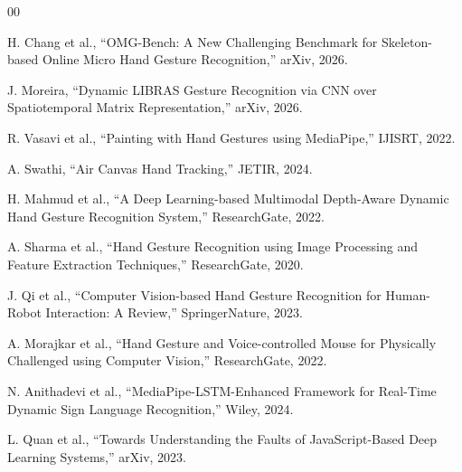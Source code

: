 \documentclass[conference]{IEEEtran}
\begin{document}
\begin{thebibliography}{00}

H. Chang et al., ``OMG-Bench: A New Challenging Benchmark for Skeleton-based Online Micro Hand Gesture Recognition,'' arXiv, 2026.

J. Moreira, ``Dynamic LIBRAS Gesture Recognition via CNN over Spatiotemporal Matrix Representation,'' arXiv, 2026.

R. Vasavi et al., ``Painting with Hand Gestures using MediaPipe,'' IJISRT, 2022.

A. Swathi, ``Air Canvas Hand Tracking,'' JETIR, 2024.

H. Mahmud et al., ``A Deep Learning-based Multimodal Depth-Aware Dynamic Hand Gesture Recognition System,'' ResearchGate, 2022.

A. Sharma et al., ``Hand Gesture Recognition using Image Processing and Feature Extraction Techniques,'' ResearchGate, 2020.

J. Qi et al., ``Computer Vision-based Hand Gesture Recognition for Human-Robot Interaction: A Review,'' SpringerNature, 2023.

A. Morajkar et al., ``Hand Gesture and Voice-controlled Mouse for Physically Challenged using Computer Vision,'' ResearchGate, 2022.

N. Anithadevi et al., ``MediaPipe-LSTM-Enhanced Framework for Real-Time Dynamic Sign Language Recognition,'' Wiley, 2024.

L. Quan et al., ``Towards Understanding the Faults of JavaScript-Based Deep Learning Systems,'' arXiv, 2023.

\end{thebibliography}
\end{document}
